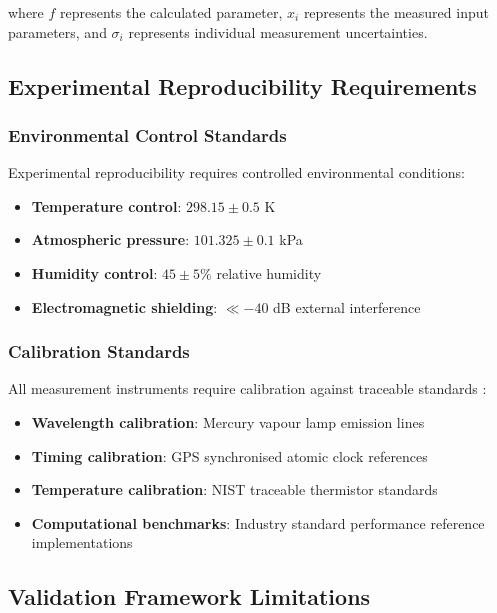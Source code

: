 \documentclass[12pt,a4paper]{article}
\begin{document}
where $f$ represents the calculated parameter, $x_i$ represents the measured input parameters, and $\sigma_i$ represents individual measurement uncertainties.

\subsection{Experimental Reproducibility Requirements}

\subsubsection{Environmental Control Standards}

Experimental reproducibility requires controlled environmental conditions:

\begin{itemize}
\item \textbf{Temperature control}: $298.15 \pm 0.5$ K
\item \textbf{Atmospheric pressure}: $101.325 \pm 0.1$ kPa  
\item \textbf{Humidity control}: $45 \pm 5\%$ relative humidity
\item \textbf{Electromagnetic shielding}: $\ll -40$ dB external interference
\end{itemize}

\subsubsection{Calibration Standards}

All measurement instruments require calibration against traceable standards \cite{ludlow2015optical}:

\begin{itemize}
\item \textbf{Wavelength calibration}: Mercury vapour lamp emission lines
\item \textbf{Timing calibration}: GPS synchronised atomic clock references
\item \textbf{Temperature calibration}: NIST traceable thermistor standards
\item \textbf{Computational benchmarks}: Industry standard performance reference implementations
\end{itemize}

\subsection{Validation Framework Limitations}
\end{document}
